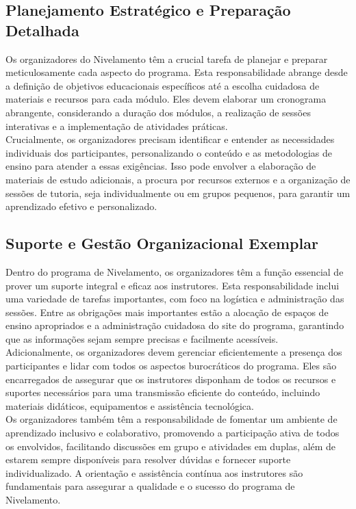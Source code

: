 \subsection{Planejamento Estratégico e Preparação Detalhada}

Os organizadores do Nivelamento têm a crucial tarefa de planejar e preparar meticulosamente cada aspecto do programa. Esta responsabilidade abrange desde a definição de objetivos educacionais específicos até a escolha cuidadosa de materiais e recursos para cada módulo. Eles devem elaborar um cronograma abrangente, considerando a duração dos módulos, a realização de sessões interativas e a implementação de atividades práticas.\\

Crucialmente, os organizadores precisam identificar e entender as necessidades individuais dos participantes, personalizando o conteúdo e as metodologias de ensino para atender a essas exigências. Isso pode envolver a elaboração de materiais de estudo adicionais, a procura por recursos externos e a organização de sessões de tutoria, seja individualmente ou em grupos pequenos, para garantir um aprendizado efetivo e personalizado.

\subsection{Suporte e Gestão Organizacional Exemplar}

Dentro do programa de Nivelamento, os organizadores têm a função essencial de prover um suporte integral e eficaz aos instrutores. Esta responsabilidade inclui uma variedade de tarefas importantes, com foco na logística e administração das sessões. Entre as obrigações mais importantes estão a alocação de espaços de ensino apropriados e a administração cuidadosa do site do programa, garantindo que as informações sejam sempre precisas e facilmente acessíveis.\\

Adicionalmente, os organizadores devem gerenciar eficientemente a presença dos participantes e lidar com todos os aspectos burocráticos do programa. Eles são encarregados de assegurar que os instrutores disponham de todos os recursos e suportes necessários para uma transmissão eficiente do conteúdo, incluindo materiais didáticos, equipamentos e assistência tecnológica.\\

Os organizadores também têm a responsabilidade de fomentar um ambiente de aprendizado inclusivo e colaborativo, promovendo a participação ativa de todos os envolvidos, facilitando discussões em grupo e atividades em duplas, além de estarem sempre disponíveis para resolver dúvidas e fornecer suporte individualizado. A orientação e assistência contínua aos instrutores são fundamentais para assegurar a qualidade e o sucesso do programa de Nivelamento.

